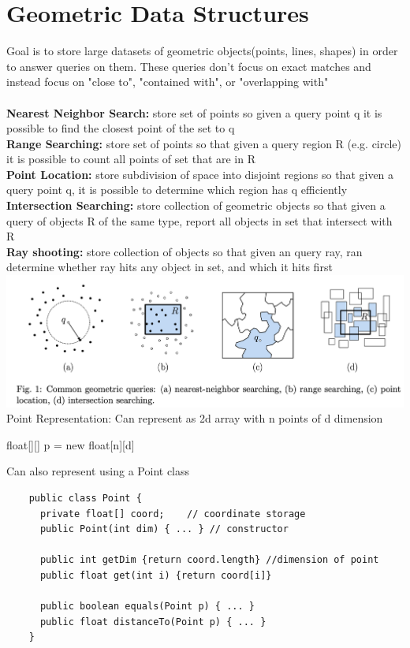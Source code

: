 \documentclass{article}
\begin{document}
  \section{Geometric Data Structures}
  Goal is to store large datasets of geometric objects(points, lines, shapes) in order to answer queries on them. These queries don't focus on exact matches and instead focus on "close to", "contained with", or "overlapping with"\\ \\
  \textbf{Nearest Neighbor Search: }store set of points so given a query point q it is possible to find the closest point of the set to q\\
  \textbf{Range Searching: }store set of points so that given a query region R (e.g. circle) it is possible to count all points of set that are in R\\
  \textbf{Point Location: }store subdivision of space into disjoint regions so that given a query point q, it is possible to determine which region has q efficiently\\
  \textbf{Intersection Searching: }store collection of geometric objects so that given a query of objects R of the same type, report all objects in set that intersect with R\\
  \textbf{Ray shooting: }store collection of objects so that given an query ray, ran determine whether ray hits any object in set, and which it hits first\\
  \includegraphics[width=\textwidth]{GeometricQueries}
  Point Representation: Can represent as 2d array with n points of d dimension
  \begin{center}
    float[][] p = new float[n][d]
  \end{center}
  Can also represent using a Point class
  \begin{lstlisting}
    public class Point {
      private float[] coord;    // coordinate storage
      public Point(int dim) { ... } // constructor

      public int getDim {return coord.length} //dimension of point
      public float get(int i) {return coord[i]}

      public boolean equals(Point p) { ... }
      public float distanceTo(Point p) { ... }
    }
  \end{lstlisting}
\end{document}

